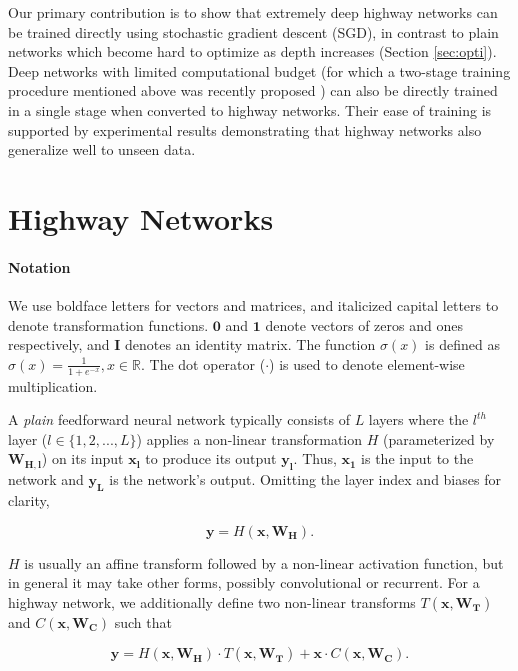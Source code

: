 \documentclass{article}
\renewcommand{\vec}[1]{\mathbf{#1}}
\begin{document}
Our primary contribution is to show that extremely deep highway networks can be trained directly using stochastic gradient descent (SGD), in contrast to plain networks which become hard to optimize as depth increases (Section \ref{sec:opti}). 
Deep networks with limited computational budget (for which a two-stage training procedure mentioned above was recently proposed \cite{Romero2014}) can also be directly trained in a single stage when converted to highway networks. Their ease of training is supported by experimental results demonstrating that highway networks also generalize well to unseen data.

\section{Highway Networks}

\paragraph{Notation}
We use boldface letters for vectors and matrices, and italicized capital letters to denote transformation functions. $\mathbf{0}$ and $\mathbf{1}$ denote vectors of zeros and ones respectively, and $\vec{I}$ denotes an identity matrix. The function $\sigma(x)$ is defined as $\sigma(x) = \frac{1}{1+e^{-x}}, x \in \mathbb{R}$. The dot operator ($\cdotp$) is used to denote element-wise multiplication.

A \emph{plain} feedforward neural network typically consists of $L$ layers where the $l^{th}$ layer ($l \in \{1, 2, ..., L\}$) applies a non-linear transformation $H$ (parameterized by $\vec{W_{H,l}}$) on its input $\vec{x_l}$ to produce its output $\vec{y_l}$. Thus, $\vec{x_1}$ is the input to the network and $\vec{y_L}$ is the network's output. Omitting the layer index and biases for clarity,

\begin{equation}\label{eq:plain}
\vec{y} = H(\vec{x}, \vec{W_H}).
\end{equation}

$H$ is usually an affine transform followed by a non-linear activation function, but in general it may take other forms, possibly convolutional or recurrent. For a highway network, we additionally define two non-linear transforms $T(\vec{x}, \vec{W_T})$ and $C(\vec{x}, \vec{W_C})$ such that

\begin{equation}\label{eq:highway}
\vec{y} = H(\vec{x}, \vec{W_H}) \cdotp T(\vec{x}, \vec{W_T}) + \vec{x} \cdot C(\vec{x}, \vec{W_C}).
\end{equation}
\end{document}
